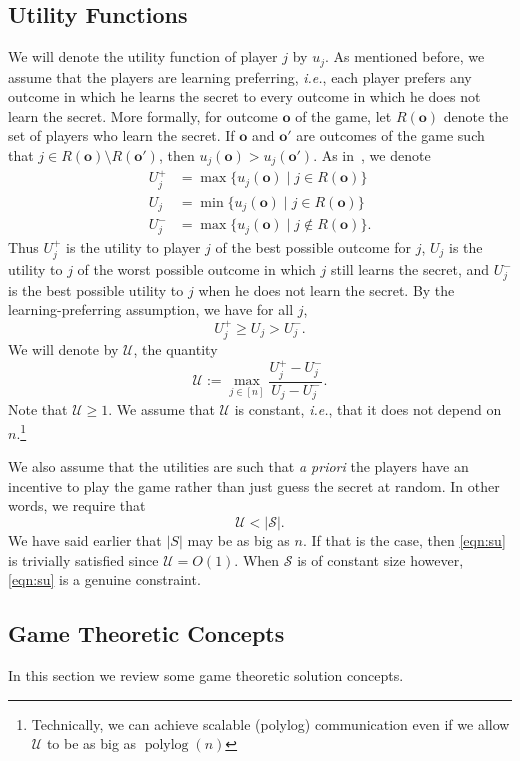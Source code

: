 \documentclass[12pt]{article}
\theoremstyle{definition}
\newcommand{\ie}{\emph{i.e.}}
\newcommand{\Uplus}{U^{+}}
\newcommand{\Uminus}{U^{-}}
\newcommand{\U}{\mathcal{U}}
\renewcommand{\S}{\mathcal{S}}
\DeclareMathOperator{\polylog}{polylog}
\begin{document}
\subsection{Utility Functions}
We will denote the utility function of player $j$ by $u_j$. As mentioned 
before, we assume that the players are learning preferring, \ie, each player 
prefers any outcome in which he learns the secret to every outcome in 
which he does not learn the secret. More formally, for outcome $\mathbf{o}$ 
of the game, let $R(\mathbf{o})$ denote the set of players who learn the 
secret. If $\mathbf{o}$ and $\mathbf{o'}$ are outcomes of the game such 
that $j \in R(\mathbf{o}) \setminus R(\mathbf{o'})$, then 
$u_j(\mathbf{o}) > u_j(\mathbf{o'})$. 
As in~\cite{kol2008games}, we denote
\begin{align*}
\Uplus_j &= \max \{ u_j(\mathbf{o})\; | \; j \in R(\mathbf{o}) \}\\
U_j &= \min \{ u_j(\mathbf{o}) \; | \; j \in R(\mathbf{o}) \}\\
\Uminus_j &= \max \{ u_j(\mathbf{o}) \; | \; j \notin R(\mathbf{o}) \}.
\end{align*}
Thus $\Uplus_j$ is the utility to player $j$ of the best possible outcome 
for $j$, $U_j$ is the utility to $j$ of the worst possible outcome in 
which $j$ still learns the secret, and $\Uminus_j$ is the best possible 
utility to $j$ when he does not learn the secret. By the learning-preferring 
assumption, we have for all $j$,
\[
\Uplus_j \ge U_j > \Uminus_j.
\]
We will denote by $\U$, the quantity
\[
\U := \max_{j \in [n]} \frac{\Uplus_j - \Uminus_j}{U_j -\Uminus_j}.
\] 
Note that $\U \ge 1$. We assume that $\U$ is constant, \ie, that it does 
not depend on $n$.\footnote{Technically, we can achieve scalable (polylog)
communication even if we allow $\U$ to be as big as $\polylog(n)$}

We also assume that the utilities are such that \emph{a priori} the players 
have an incentive to play the game rather than just guess the secret at 
random. In other words, we require that 
\begin{equation}\label{eqn:su}
\U < |\S|.
\end{equation}
We have said earlier that $|S|$ may be as big as $n$.  If that is the case, 
then \eqref{eqn:su} is trivially satisfied since $\U =O(1)$. When $\S$ is of 
constant size however, \eqref{eqn:su} is a genuine constraint. 


\subsection{Game Theoretic Concepts}
In this section we review some game theoretic solution concepts.
\end{document}
